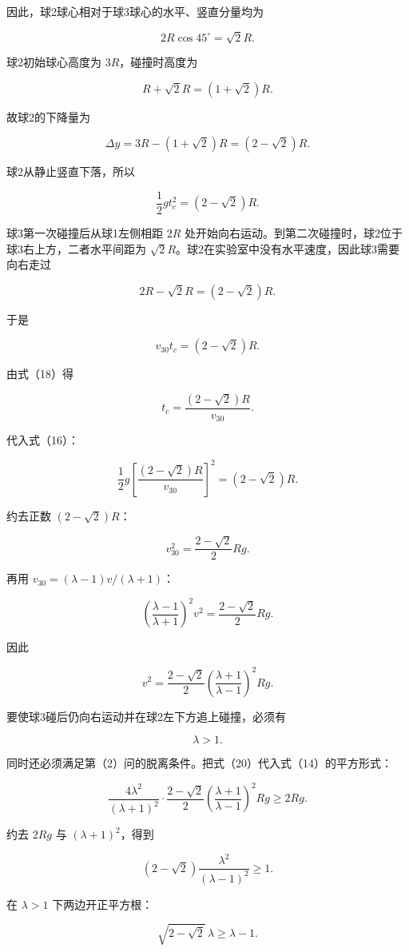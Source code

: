 \documentclass[12pt,a4paper,UTF8]{ctexart}
\begin{document}
因此，球2球心相对于球3球心的水平、竖直分量均为

\[
2R\cos45^\circ=\sqrt2R.
\]

球2初始球心高度为 \(3R\)，碰撞时高度为

\[
R+\sqrt2R=(1+\sqrt2)R.
\]

故球2的下降量为

\[
\Delta y
=3R-(1+\sqrt2)R
=(2-\sqrt2)R. \tag{15}
\]

球2从静止竖直下落，所以

\[
\frac12gt_c^2=(2-\sqrt2)R. \tag{16}
\]

球3第一次碰撞后从球1左侧相距 \(2R\)
处开始向右运动。到第二次碰撞时，球2位于球3右上方，二者水平间距为
\(\sqrt2R\)。球2在实验室中没有水平速度，因此球3需要向右走过

\[
2R-\sqrt2R=(2-\sqrt2)R. \tag{17}
\]

于是

\[
v_{30}t_c=(2-\sqrt2)R. \tag{18}
\]

由式（18）得

\[
t_c=\frac{(2-\sqrt2)R}{v_{30}}.
\]

代入式（16）：

\[
\frac12g\left[\frac{(2-\sqrt2)R}{v_{30}}\right]^2
=(2-\sqrt2)R.
\]

约去正数 \((2-\sqrt2)R\)：

\[
v_{30}^2=\frac{2-\sqrt2}{2}Rg. \tag{19}
\]

再用 \(v_{30}=(\lambda-1)v/(\lambda+1)\)：

\[
\left(\frac{\lambda-1}{\lambda+1}\right)^2v^2
=\frac{2-\sqrt2}{2}Rg.
\]

因此

\[
v^2
=\frac{2-\sqrt2}{2}
\left(\frac{\lambda+1}{\lambda-1}\right)^2Rg. \tag{20}
\]

要使球3碰后仍向右运动并在球2左下方追上碰撞，必须有

\[
\lambda>1. \tag{21}
\]

同时还必须满足第（2）问的脱离条件。把式（20）代入式（14）的平方形式：

\[
\frac{4\lambda^2}{(\lambda+1)^2}
\cdot
\frac{2-\sqrt2}{2}
\left(\frac{\lambda+1}{\lambda-1}\right)^2Rg
\ge2Rg.
\]

约去 \(2Rg\) 与 \((\lambda+1)^2\)，得到

\[
(2-\sqrt2)\frac{\lambda^2}{(\lambda-1)^2}\ge1. \tag{22}
\]

在 \(\lambda>1\) 下两边开正平方根：

\[
\sqrt{2-\sqrt2}\,\lambda\ge\lambda-1.
\]
\end{document}
